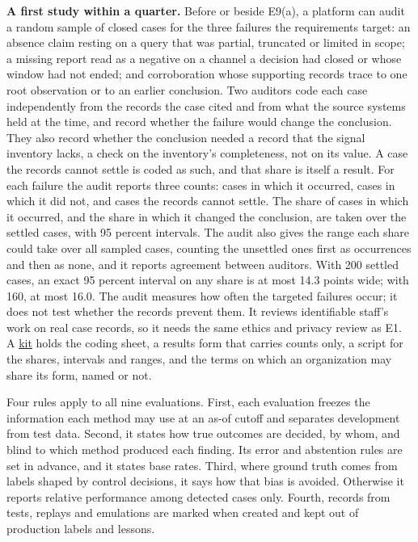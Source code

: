 \documentclass[
  11pt,
]{article}
\begin{document}
\textbf{A first study within a quarter.} Before or beside E9(a), a
platform can audit a random sample of closed cases for the three
failures the requirements target: an absence claim resting on a query
that was partial, truncated or limited in scope; a missing report read
as a negative on a channel a decision had closed or whose window had not
ended; and corroboration whose supporting records trace to one root
observation or to an earlier conclusion. Two auditors code each case
independently from the records the case cited and from what the source
systems held at the time, and record whether the failure would change
the conclusion. They also record whether the conclusion needed a record
that the signal inventory lacks, a check on the inventory's
completeness, not on its value. A case the records cannot settle is
coded as such, and that share is itself a result. For each failure the
audit reports three counts: cases in which it occurred, cases in which
it did not, and cases the records cannot settle. The share of cases in
which it occurred, and the share in which it changed the conclusion, are
taken over the settled cases, with 95 percent intervals. The audit also
gives the range each share could take over all sampled cases, counting
the unsettled ones first as occurrences and then as none, and it reports
agreement between auditors. With 200 settled cases, an exact 95 percent
interval on any share is at most 14.3 points wide; with 160, at most
16.0. The audit measures how often the targeted failures occur; it does
not test whether the records prevent them. It reviews identifiable
staff's work on real case records, so it needs the same ethics and
privacy review as E1. A \href{tools/closed_case_audit/README.md}{kit}
holds the coding sheet, a results form that carries counts only, a
script for the shares, intervals and ranges, and the terms on which an
organization may share its form, named or not.

Four rules apply to all nine evaluations. First, each evaluation freezes
the information each method may use at an as-of cutoff and separates
development from test data. Second, it states how true outcomes are
decided, by whom, and blind to which method produced each finding. Its
error and abstention rules are set in advance, and it states base rates.
Third, where ground truth comes from labels shaped by control decisions,
it says how that bias is avoided. Otherwise it reports relative
performance among detected cases only. Fourth, records from tests,
replays and emulations are marked when created and kept out of
production labels and lessons.
\end{document}
